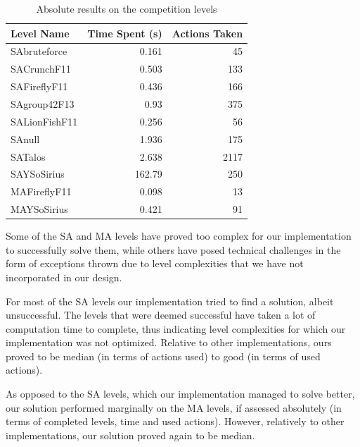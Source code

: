 \documentclass[letterpaper]{article}
\begin{document}
\begin{table}[h]
\begin{center}
  	\begin{tabular}{ | l || r | r | }
    	\hline
    	\textbf{Level Name} & \textbf{Time Spent (s)} & \textbf{Actions Taken} \\ \hline
    	SAbruteforce & 0.161 & 45 \\ \hline
    	SACrunchF11 & 0.503 & 133 \\ \hline
    	SAFireflyF11 & 0.436 & 166 \\ \hline
    	SAgroup42F13 & 0.93 & 375 \\ \hline
    	SALionFishF11 & 0.256 & 56 \\ \hline
    	SAnull & 1.936 & 175 \\ \hline
    	SATalos & 2.638 & 2117 \\ \hline
    	SAYSoSirius & 162.79 & 250 \\ \hline
    	MAFireflyF11 & 0.098 & 13 \\ \hline
    	MAYSoSirius & 0.421 & 91 \\
    	\hline
	\end{tabular}
\caption[Table caption text]{Absolute results on the competition levels}
\label{table:results}
\end{center}
\end{table}


Some of the SA and MA levels have proved too complex for our implementation to successfully solve them, while others have posed technical challenges in the form of exceptions thrown due to level complexities that we have not incorporated in our design.

For most of the SA levels our implementation tried to find a solution, albeit unsuccessful. The levels that were deemed successful have taken a lot of computation time to complete, thus indicating level complexities for which our implementation was not optimized. Relative to other implementations, ours proved to be median (in terms of actions used) to good (in terms of used actions).

As opposed to the SA levels, which our implementation managed to solve better, our solution performed marginally on the MA levels, if assessed absolutely (in terms of completed levels, time and used actions). However, relatively to other implementations, our solution proved again to be median.
\end{document}
